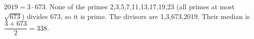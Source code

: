 $2019=3\cdot673$. None of the primes 2,3,5,7,11,13,17,19,23 (all primes at most $\sqrt{673}$) divides 673, so it is prime. The divisors are 1,3,673,2019. Their median is $\dfrac{3+673}{2}=\boxed{338}$.
